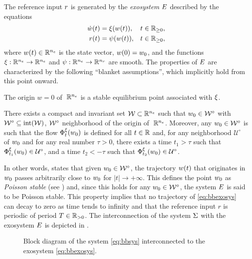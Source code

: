 The reference input $r$ is generated by the \emph{exosystem} $E$ described by the equations
\begin{subequations}
  \label{eq:bbexosys}
  \begin{align}
    \dot{w}(t) & = \xi(w(t)), & t\in\mathbb{R}_{\geq 0}, \\
    r(t)            & = \psi(w(t)), & t\in\mathbb{R}_{\geq 0},
  \end{align}
\end{subequations}
where $w(t)\in\mathbb{R}^{{n_e}}$ is the state vector, $w(0)=w_0$, and the functions $\xi : \mathbb{R}^{{n_e}} \rightarrow \mathbb{R}^{{n_e}}$ and $\psi : \mathbb{R}^{{n_e}} \rightarrow \mathbb{R}^{{n_r}}$ are smooth. The properties of $E$ are characterized by the following ``blanket assumptions'', which implicitly hold from this point onward.

\begin{assumption}
  \label{ass:bbexoorig}
  The origin $w=0$ of $\;\mathbb{R}^{n_e}$ is a stable equilibrium point associated with $\xi$.\closestatement
\end{assumption}

\begin{assumption}
  \label{ass:bbexopoisson}
  There exists a compact and invariant set $\mathcal{W}\subset\mathbb{R}^{{n_e}}$ such that $w_0\in\mathcal{W}^\circ$ with $\mathcal{W}^\circ \subseteq \operatorname{int}(\mathcal{W})$, $\mathcal{W}^\circ$ neighborhood of the origin of $\;\mathbb{R}^{n_e}$. Moreover, any $w_0\in\mathcal{W}^\circ$ is such that the flow $\Phi^{\xi}_{t}(w_0)$ is defined for all $t\in\mathbb{R}$ and, for any neighborhood $\mathcal{U}^\circ$ of $w_0$ and for any real number $\tau>0$, there exists a time $t_1>\tau$ such that $\Phi^{\xi}_{t_1}(w_0)\in\mathcal{U}^\circ$, and a time $t_2<-\tau$ such that $\Phi^{\xi}_{t_2}(w_0)\in\mathcal{U}^\circ$.\closestatement
\end{assumption}

In other words,  states that given $w_0\in\mathcal{W}^\circ$, the trajectory $w(t)$ that originates in $w_0$ passes arbitrarily close to $w_0$ for $\left|t\right|\rightarrow +\infty$. This defines the point $w_0$ as \emph{Poisson stable} (see \cite{isidori_nonlinear_1995}) and, since this holds for any $w_0\in\mathcal{W}^\circ$, the system $E$ is said to be Poisson stable. This property implies that no trajectory of \eqref{eq:bbexosys} can decay to zero as time tends to infinity and that the reference input $r$ is periodic of period $T\in\mathbb{R}_{>0}$. The interconnection of the system $\Sigma$ with the exosystem $E$ is depicted in .
\begin{figure}[!t]
  \centering
  
  \caption{Block diagram of the system \eqref{eq:bbsys} interconnected to the exosystem \eqref{eq:bbexosys}.}
  \label{fig:bbsys}
\end{figure}


